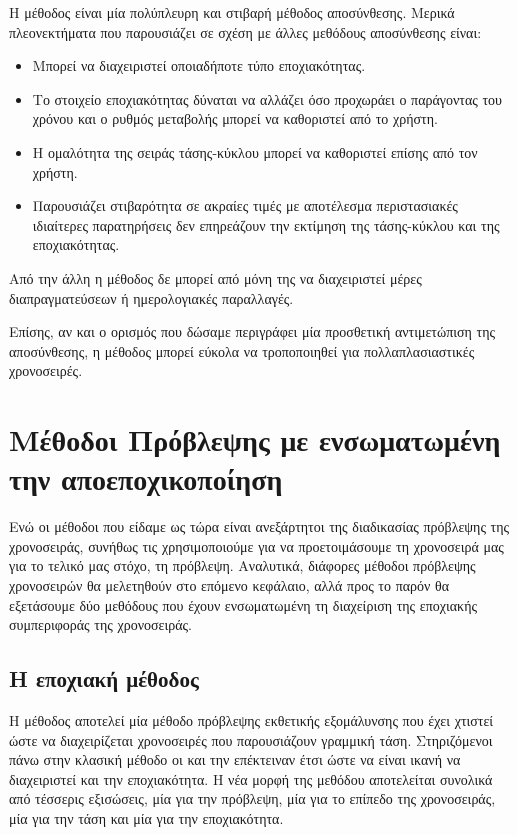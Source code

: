 Η μέθοδος  είναι μία πολύπλευρη και στιβαρή μέθοδος αποσύνθεσης. Μερικά πλεονεκτήματα που παρουσιάζει σε σχέση με άλλες μεθόδους αποσύνθεσης είναι:
\begin{itemize}
  \item Μπορεί να διαχειριστεί οποιαδήποτε τύπο εποχιακότητας.
  \item Το στοιχείο εποχιακότητας δύναται να αλλάζει όσο προχωράει ο παράγοντας του χρόνου και ο ρυθμός μεταβολής μπορεί να καθοριστεί από το χρήστη.
  \item Η ομαλότητα της σειράς τάσης-κύκλου μπορεί να καθοριστεί επίσης από τον χρήστη.
  \item Παρουσιάζει στιβαρότητα σε ακραίες τιμές με αποτέλεσμα περιστασιακές ιδιαίτερες παρατηρήσεις δεν επηρεάζουν την εκτίμηση της τάσης-κύκλου και της εποχιακότητας. 
\end{itemize}

Από την άλλη η μέθοδος δε μπορεί από μόνη της να διαχειριστεί μέρες διαπραγματεύσεων ή ημερολογιακές παραλλαγές.

Επίσης, αν και ο ορισμός που δώσαμε περιγράφει μία προσθετική αντιμετώπιση της αποσύνθεσης, η μέθοδος μπορεί εύκολα να τροποποιηθεί για πολλαπλασιαστικές χρονοσειρές.

\section{Μέθοδοι Πρόβλεψης με ενσωματωμένη την αποεποχικοποίηση}
	
Ενώ οι μέθοδοι που είδαμε ως τώρα είναι ανεξάρτητοι της διαδικασίας πρόβλεψης της χρονοσειράς, συνήθως τις χρησιμοποιούμε για να προετοιμάσουμε τη χρονοσειρά μας για το τελικό μας στόχο, τη πρόβλεψη. Αναλυτικά, διάφορες μέθοδοι πρόβλεψης χρονοσειρών θα μελετηθούν στο επόμενο κεφάλαιο, αλλά προς το παρόν θα εξετάσουμε δύο μεθόδους που έχουν ενσωματωμένη τη διαχείριση της εποχιακής συμπεριφοράς της χρονοσειράς.

\subsection{Η εποχιακή μέθοδος }

Η μέθοδος  αποτελεί μία μέθοδο πρόβλεψης εκθετικής εξομάλυνσης που έχει χτιστεί ώστε να διαχειρίζεται χρονοσειρές που παρουσιάζουν γραμμική τάση. Στηριζόμενοι πάνω στην κλασική μέθοδο οι  και  την επέκτειναν έτσι ώστε να είναι ικανή να διαχειριστεί και την εποχιακότητα. Η νέα μορφή της μεθόδου αποτελείται συνολικά από τέσσερις εξισώσεις, μία για την πρόβλεψη, μία για το επίπεδο της χρονοσειράς, μία για την τάση και μία για την εποχιακότητα.

